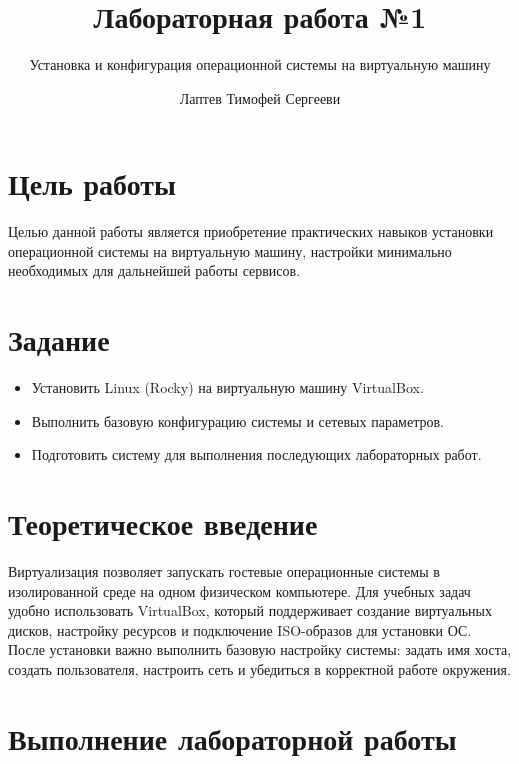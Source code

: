 \documentclass[
  english,
  russian,
  12pt,
  a4paper,
  DIV=11,
  numbers=noendperiod]{scrreprt}
\title{Лабораторная работа №1}
\subtitle{Установка и конфигурация операционной системы на виртуальную
машину}
\author{Лаптев Тимофей Сергееви}
\date{}
\providecommand{\tightlist}{%
  \setlength{\itemsep}{0pt}\setlength{\parskip}{0pt}}
\renewcommand*\contentsname{Содержание}
\newcommand\contentsname{Содержание}
\begin{document}
\maketitle

\renewcommand*\contentsname{Содержание}
{
\setcounter{tocdepth}{1}
\tableofcontents
}
\listoffigures
\listoftables

\chapter{Цель
работы}\label{ux446ux435ux43bux44c-ux440ux430ux431ux43eux442ux44b}

Целью данной работы является приобретение практических навыков установки
операционной системы на виртуальную машину, настройки минимально
необходимых для дальнейшей работы сервисов.

\chapter{Задание}\label{ux437ux430ux434ux430ux43dux438ux435}

\begin{itemize}
\tightlist
\item
  Установить Linux (Rocky) на виртуальную машину VirtualBox.
\item
  Выполнить базовую конфигурацию системы и сетевых параметров.
\item
  Подготовить систему для выполнения последующих лабораторных работ.
\end{itemize}

\chapter{Теоретическое
введение}\label{ux442ux435ux43eux440ux435ux442ux438ux447ux435ux441ux43aux43eux435-ux432ux432ux435ux434ux435ux43dux438ux435}

Виртуализация позволяет запускать гостевые операционные системы в
изолированной среде на одном физическом компьютере. Для учебных задач
удобно использовать VirtualBox, который поддерживает создание
виртуальных дисков, настройку ресурсов и подключение ISO-образов для
установки ОС. После установки важно выполнить базовую настройку системы:
задать имя хоста, создать пользователя, настроить сеть и убедиться в
корректной работе окружения.

\chapter{Выполнение лабораторной
работы}\label{ux432ux44bux43fux43eux43bux43dux435ux43dux438ux435-ux43bux430ux431ux43eux440ux430ux442ux43eux440ux43dux43eux439-ux440ux430ux431ux43eux442ux44b}
\end{document}

